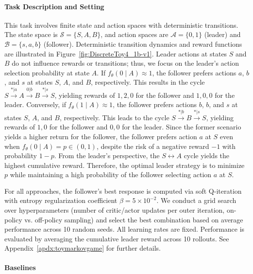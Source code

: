 \documentclass[letterpaper]{article} %
\begin{document}
\paragraph{Task Description and Setting}
This task involves finite state and action spaces with deterministic transitions.
The state space is $\mathcal{S} = \{S, A, B\}$, and action spaces are $\mathcal{A} = \{0, 1\}$ (leader) and $\mathcal{B} = \{s, a, b\}$ (follower).
Deterministic transition dynamics and reward functions are illustrated in Figure~\ref{fig:DiscreteToy4_1b-v1}.
Leader actions at states $S$ and $B$ do not influence rewards or transitions; thus, we focus on the leader's action selection probability at state $A$.
If $f_{\theta}(0\mid A) \approx 1$, the follower prefers actions $a$, $b$, and $s$ at states $S$, $A$, and $B$, respectively. This results in the cycle $S \xrightarrow{*|a} A \xrightarrow{0|b} B \xrightarrow{*|s} S$, yielding rewards of $1, 2, 0$ for the follower and $1, 0, 0$ for the leader.
Conversely, if $f_{\theta}(1\mid A) \approx 1$, the follower prefers actions $b$, $b$, and $s$ at states $S$, $A$, and $B$, respectively. This leads to the cycle $S \xrightarrow{*|b} B \xrightarrow{*|s} S$, yielding rewards of $1, 0$ for the follower and $0, 0$ for the leader.
Since the former scenario yields a higher return for the follower, the follower prefers action $a$ at $S$ even when $f_{\theta}(0 \mid A) = p \in (0, 1)$, despite the risk of a negative reward $-1$ with probability $1-p$.
From the leader's perspective, the $S \leftrightarrow A$ cycle yields the highest cumulative reward.
Therefore, the optimal leader strategy is to minimize $p$ while maintaining a high probability of the follower selecting action $a$ at $S$. 

For all approaches, the follower's best response is computed via soft Q-iteration with entropy regularization coefficient $\beta=5\times10^{-2}$.
We conduct a grid search over hyperparameters (number of critic/actor updates per outer iteration, on-policy vs. off-policy sampling) and select the best combination based on average performance across 10 random seeds.
All learning rates are fixed.
Performance is evaluated by averaging the cumulative leader reward across 10 rollouts.
See Appendix~\ref{apdx:toymarkovgame} for further details.

\paragraph{Baselines}
\end{document}

